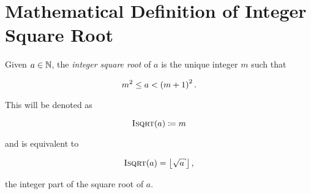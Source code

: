 \section{Mathematical Definition of Integer Square Root}

Given $a\in\mathbb{N}$, the \emph{integer square root} of $a$
is the unique integer $m$ such that

\begin{equation}
    m^{2} \le a < \left( m+1 \right)^{2}.
\end{equation}

\noindent
This will be denoted as

\begin{equation}
    \textsc{Isqrt}( a ) \coloneqq{} m
\end{equation}

\noindent
and is equivalent to 

\begin{equation}
    \isqrt{a} = \floor{\sqrt{a}},
\end{equation}

\noindent
the integer part of the square root of $a$.
